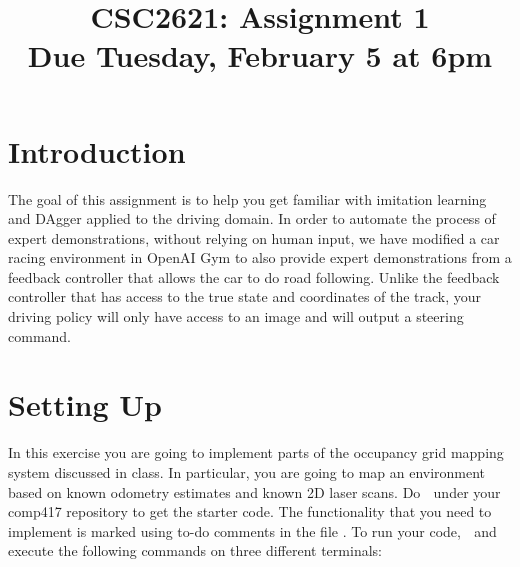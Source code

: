 \documentclass[a4paper,10pt]{article}
\title{CSC2621: Assignment 1\\Due Tuesday, February 5  at 6pm}
\author{}
\begin{document}
\maketitle


\section{Introduction}
The goal of this assignment is to help you get familiar with imitation learning and DAgger applied to the driving domain. In order to automate the process of expert demonstrations,
without relying on human input, we have modified a car racing environment in OpenAI Gym to also provide expert demonstrations from a feedback controller that allows the car 
to do road following. Unlike the feedback controller that has access to the true state and coordinates of the track, your driving policy will only have access to an image
and will output a steering command. 


\section{Setting Up}




In this exercise you are going to implement parts of the occupancy grid mapping system discussed in class. In particular, you are going to map an environment 
based on known odometry estimates and known 2D laser scans. Do  $\;$  under your comp417 repository to get the starter code. The functionality 
that you need to implement is marked using to-do comments in the file . To run your code, 
 $\;$  and execute the following commands on three different terminals: 
\newline

   $\;$  $\;$ 
  
   $\;$  $\;$  $\;$  $\;$ 
  
\end{document}
